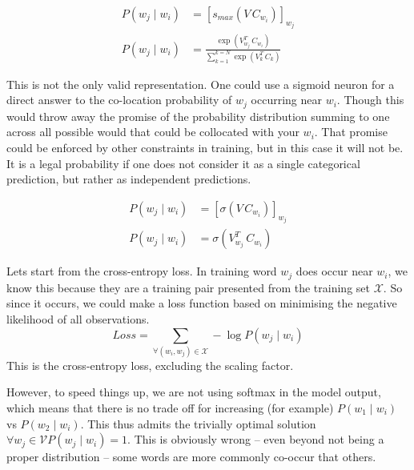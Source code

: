 \documentclass[parskip]{komatufte}
\begin{document}
\begin{align}
P(w_j \mid w_{i}) & = \left[ s_{max}(V\,C_{w_{i}}) \right]_{w_j} \\
P(w_j \mid w_{i}) & = \frac{\exp(V_{w_j}^T\,C_{w_{i}})}{\sum_{k=1}^{k=N} \exp(V_k^T\,C_{k})}
\end{align}



This is not the only valid representation.
One could use a sigmoid neuron for a direct answer to the co-location probability of $w_j$ occurring near $w_i$.
Though this would throw away the promise of the probability distribution summing to one across all possible would that could be collocated with your $w_i$.
That promise could be enforced by other constraints in training, but in this case it will not be.
It is a legal probability if one does not consider it as a single categorical prediction, but rather as independent predictions.

\begin{align}
P(w_j \mid w_{i}) & = \left[\sigma(V\,C_{w_{i}}) \right]_{w_j} \\
P(w_j \mid w_{i}) & = \sigma(V_{w_j}^T\,C_{w_{i}})
\end{align}


Lets start from the cross-entropy loss.
In training word $w_j$ does occur near $w_i$, we know this because they are a training pair presented from the training set $\mathcal{X}$.
So since it occurs, we could make a loss function based on minimising the negative likelihood of all observations.
\begin{equation}
Loss = \sum_{\forall (w_i,w_j)\in \mathcal{X}} -\log P(w_j\mid w_i)
\end{equation}
This is the cross-entropy loss, excluding the scaling factor.

However, to speed things up, we are not using softmax in the model output,
which means that there is no trade off for increasing (for example) $P(w_1\mid w_i)$ vs $P(w_2\mid w_i)$.
This thus admits the trivially optimal solution $\forall w_j\in \mathcal{V} P(w_j \mid w_i) = 1$.
This is obviously wrong -- even beyond not being a proper distribution -- some words are more commonly co-occur that others.
\end{document}
